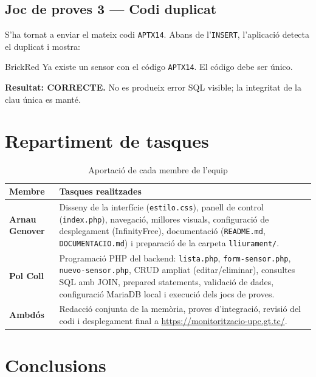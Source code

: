 \documentclass[12pt, a4paper]{article}
\begin{document}
\subsection{Joc de proves 3 --- Codi duplicat}

S'ha tornat a enviar el mateix codi \texttt{APTX14}. Abans de l'\texttt{INSERT}, l'aplicació detecta el duplicat i mostra:

\begin{resultbox}[Resultat]{BrickRed}
  Ya existe un sensor con el código \texttt{APTX14}. El código debe ser único.
\end{resultbox}

\textbf{Resultat: CORRECTE.} No es produeix error SQL visible; la integritat de la clau única es manté.

\section{Repartiment de tasques}

\begin{table}[h!]
  \centering
  \caption{Aportació de cada membre de l'equip}
  \label{tab:tasques}
  \begin{tabularx}{\textwidth}{>{\bfseries}l X}
    \toprule
    Membre & Tasques realitzades \\
    \midrule
    Arnau Genover &
    Disseny de la interfície (\texttt{estilo.css}), panell de control (\texttt{index.php}), navegació, millores visuals, configuració de desplegament (InfinityFree), documentació (\texttt{README.md}, \texttt{DOCUMENTACIO.md}) i preparació de la carpeta \texttt{lliurament/}. \\[6pt]
    Pol Coll &
    Programació PHP del backend: \texttt{lista.php}, \texttt{form-sensor.php}, \texttt{nuevo-sensor.php}, CRUD ampliat (editar/eliminar), consultes SQL amb JOIN, prepared statements, validació de dades, configuració MariaDB local i execució dels jocs de proves. \\[6pt]
    Ambdós &
    Redacció conjunta de la memòria, proves d'integració, revisió del codi i desplegament final a \url{https://monitoritzacio-upc.gt.tc/}. \\
    \bottomrule
  \end{tabularx}
\end{table}

\section{Conclusions}
\end{document}
